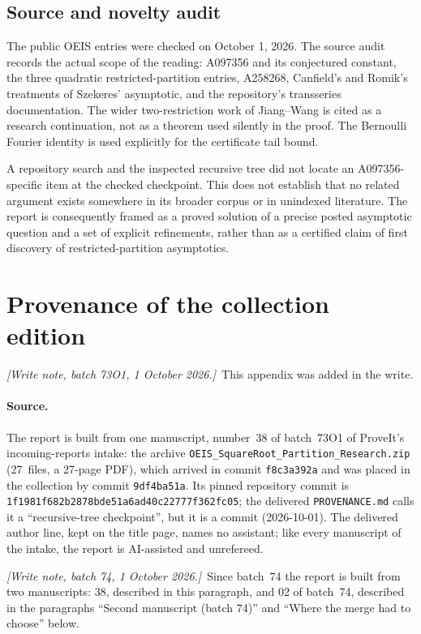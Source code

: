 \documentclass[11pt,a4paper]{article}
\numberwithin{equation}{section}
\theoremstyle{definition}
\theoremstyle{remark}
\newcommand{\writenote}[1]{\par\smallskip\noindent
 \textit{[Write note, batch 73O1, 1 October 2026.]}\ #1\par\smallskip}
\newcommand{\writenotefour}[1]{\par\smallskip\noindent
 \textit{[Write note, batch 74, 1 October 2026.]}\ #1\par\smallskip}
\begin{document}
\subsection{Source and novelty audit}
The public OEIS entries were checked on October 1, 2026. The source audit
records the actual scope of the reading: A097356 and its conjectured
constant, the three quadratic restricted-partition entries, A258268,
Canfield's and Romik's treatments of Szekeres' asymptotic, and the
repository's transseries documentation. The wider two-restriction work
of Jiang--Wang is cited as a research continuation, not as a theorem
used silently in the proof. The Bernoulli Fourier identity is used
explicitly for the certificate tail bound.

A repository search and the inspected recursive tree did not locate an
A097356-specific item at the checked checkpoint. This does not establish
that no related argument exists somewhere in its broader corpus or in
unindexed literature. The report is consequently framed as a proved
solution of a precise posted asymptotic question and a set of explicit
refinements, rather than as a certified claim of first discovery of
restricted-partition asymptotics.

\section{Provenance of the collection edition}
\label{srp:app:provenance}

\writenote{This appendix was added in the write.}

\paragraph{Source.} The report is built from one manuscript, number~38
of batch~73O1 of ProveIt's incoming-reports intake: the archive
\texttt{OEIS\_SquareRoot\_Partition\_Research.zip} (27~files, a 27-page
PDF), which arrived in commit \texttt{f8c3a392a} and was placed in the
collection by commit \texttt{9df4ba51a}. Its pinned repository commit is
\nolinkurl{1f1981f682b2878bde51a6ad40c22777f362fc05}; the delivered
\texttt{PROVENANCE.md} calls it a ``recursive-tree checkpoint'', but it
is a commit (2026-10-01). The delivered author line, kept on the title
page, names no assistant; like every manuscript of the intake, the
report is AI-assisted and unrefereed.

\writenotefour{Since batch~74 the report is built from two manuscripts:
38, described in this paragraph, and 02 of batch~74, described in the
paragraphs ``Second manuscript (batch 74)'' and ``Where the merge had to
choose'' below.}
\end{document}

